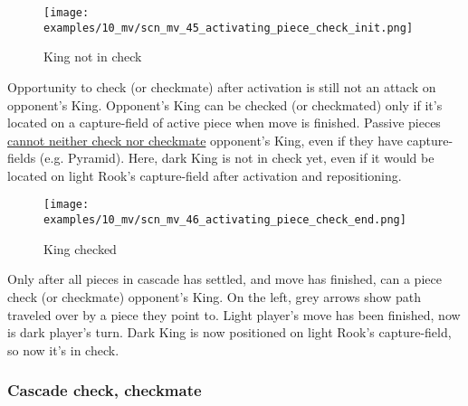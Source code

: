 \vspace*{-0.7\baselineskip}
\noindent
\begin{wrapfigure}[15]{l}{0.4\textwidth}
\centering
\texttt{[image: examples/10\_mv/scn\_mv\_45\_activating\_piece\_check\_init.png]}
\vspace*{-1.4\baselineskip}
\caption{King not in check}
\label{fig:scn_mv_45_activating_piece_check_init}
\end{wrapfigure}
Opportunity to check (or checkmate) after activation is still not
an attack on opponent's King. \newline
\indent
Opponent's King can be checked (or checkmated) only if it's located
on a capture-field of active piece when move is finished. \newline
\indent
Passive pieces
\hyperref[fig:scn_ma_19_pyramid_vs_king]{cannot neither check nor checkmate}
opponent's King, even if they have capture-fields (e.g. Pyramid). \newline
\indent
Here, dark King is not in check yet, even if it would be located on light
Rook's capture-field after activation and repositioning.

\noindent
\begin{wrapfigure}[11]{l}{0.4\textwidth}
\centering
\texttt{[image: examples/10\_mv/scn\_mv\_46\_activating\_piece\_check\_end.png]}
\vspace*{-1.4\baselineskip}
\caption{King checked}
\label{fig:scn_mv_46_activating_piece_check_end}
\end{wrapfigure}
Only after all pieces in cascade has settled, and move has finished, can a piece
check (or checkmate) opponent's King. \newline
\indent
On the left, grey arrows show path traveled over by a piece they point to.
Light player's move has been finished, now is dark player's turn. Dark King
is now positioned on light Rook's capture-field, so now it's in check.

\clearpage %

\subsubsection*{Cascade check, checkmate}
\label{sec:Miranda's veil/Wave/Cascading Waves/Cascade check, checkmate}

